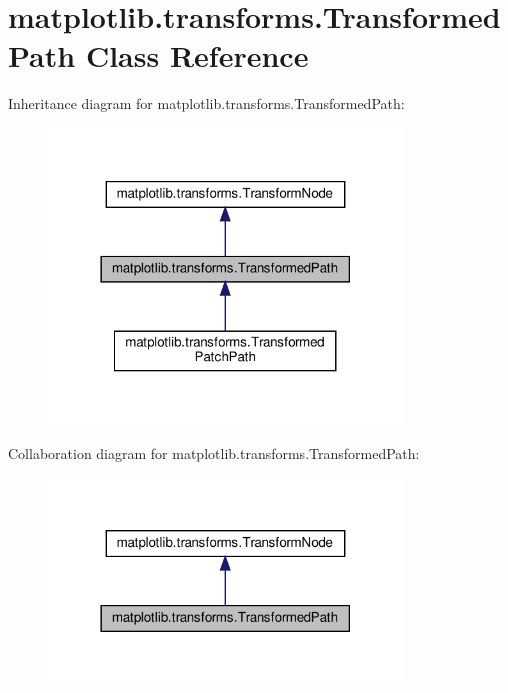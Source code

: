 \hypertarget{classmatplotlib_1_1transforms_1_1TransformedPath}{}\section{matplotlib.\+transforms.\+Transformed\+Path Class Reference}
\label{classmatplotlib_1_1transforms_1_1TransformedPath}


Inheritance diagram for matplotlib.\+transforms.\+Transformed\+Path\+:
\nopagebreak
\begin{figure}[H]
\begin{center}
\leavevmode
\includegraphics[width=266pt]{classmatplotlib_1_1transforms_1_1TransformedPath__inherit__graph}
\end{center}
\end{figure}


Collaboration diagram for matplotlib.\+transforms.\+Transformed\+Path\+:
\nopagebreak
\begin{figure}[H]
\begin{center}
\leavevmode
\includegraphics[width=266pt]{classmatplotlib_1_1transforms_1_1TransformedPath__coll__graph}
\end{center}
\end{figure}
